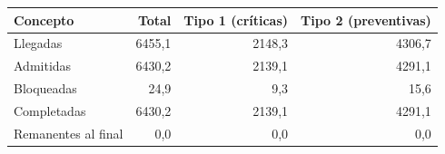 \begin{tabular}{lrrr}
\toprule
Concepto & Total & Tipo 1 (críticas) & Tipo 2 (preventivas) \\
\midrule
Llegadas & 6455,1 & 2148,3 & 4306,7 \\
Admitidas & 6430,2 & 2139,1 & 4291,1 \\
Bloqueadas & 24,9 & 9,3 & 15,6 \\
Completadas & 6430,2 & 2139,1 & 4291,1 \\
Remanentes al final & 0,0 & 0,0 & 0,0 \\
\bottomrule
\end{tabular}
